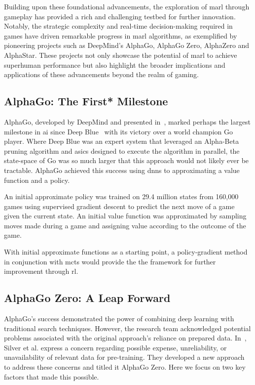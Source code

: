 Building upon these foundational advancements, the exploration of 
\gls{marl} through gameplay has provided a rich and challenging testbed for further innovation. 
Notably, the strategic complexity and real-time decision-making required in games have driven 
remarkable progress in \gls{marl} algorithms, as exemplified by pioneering projects such as 
DeepMind's AlphaGo\cite{silver2016}, AlphaGo Zero\cite{silver2017},
AlphaZero\cite{silver2017a} and AlphaStar\cite{vinyals2019}. 
These projects not only showcase the potential of \gls{marl} to achieve superhuman performance 
but also highlight the broader implications and applications of these advancements 
beyond the realm of gaming.

\subsection*{AlphaGo: The First* Milestone}
AlphaGo, developed by DeepMind and presented in~\cite{silver2016}, 
marked perhaps the largest milestone in \gls{ai} since Deep Blue~\cite{campbell2002}
with its victory over a world champion Go player.
Where Deep Blue was an expert system that leveraged an Alpha-Beta pruning algorithm
and \glspl{asic} designed to execute the algorithm in parallel,
the state-space of Go was so much larger that this approach would not likely ever be tractable. 
AlphaGo achieved this success using \glspl{dnn} to approximating a value function and a policy.

An initial approximate policy was trained on 29.4 million states from 160,000 games
using supervised gradient descent to predict the next move of a game given the current state.
An initial value function was approximated by sampling moves made during a game
and assigning value according to the outcome of the game.

With initial approximate functions as a starting point,
a policy-gradient method in conjunction with \gls{mcts}
would provide the the framework for further improvement through \gls{rl}.

\subsection*{AlphaGo Zero: A Leap Forward}
AlphaGo's success demonstrated the power of combining deep learning with traditional 
search techniques. However, the research team acknowledged potential problems associated with 
the original approach's reliance on prepared data. 
In~\cite{silver2017}, Silver et al. express a concern regarding 
possible expense, unreliability, or unavailability of relevant data for pre-training.
They developed a new approach to address these concerns and titled it AlphaGo Zero.
Here we focus on two key factors that made this possible.

